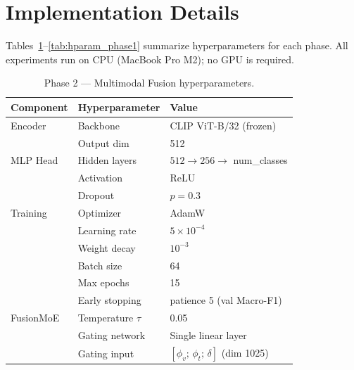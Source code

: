 \section{Implementation Details}
\label{sec:impl_details}

Tables~\ref{tab:hparam_phase2}--\ref{tab:hparam_phase1} summarize hyperparameters for each phase.
All experiments run on CPU (MacBook Pro M2); no GPU is required.

\begin{table}[h]
\centering
\caption{Phase 2 — Multimodal Fusion hyperparameters.}
\label{tab:hparam_phase2}
\begin{tabular}{lll}
\toprule
\textbf{Component} & \textbf{Hyperparameter} & \textbf{Value} \\
\midrule
Encoder      & Backbone        & CLIP ViT-B/32 (frozen) \\
             & Output dim      & 512 \\
\midrule
MLP Head     & Hidden layers   & $512 \to 256 \to$ num\_classes \\
             & Activation      & ReLU \\
             & Dropout         & $p = 0.3$ \\
\midrule
Training     & Optimizer       & AdamW \\
             & Learning rate   & $5\times10^{-4}$ \\
             & Weight decay    & $10^{-3}$ \\
             & Batch size      & 64 \\
             & Max epochs      & 15 \\
             & Early stopping  & patience 5 (val Macro-F1) \\
\midrule
FusionMoE    & Temperature $\tau$   & 0.05 \\
             & Gating network  & Single linear layer \\
             & Gating input    & $[\phi_v;\,\phi_t;\,\delta]$ (dim 1025) \\
\bottomrule
\end{tabular}
\end{table}

